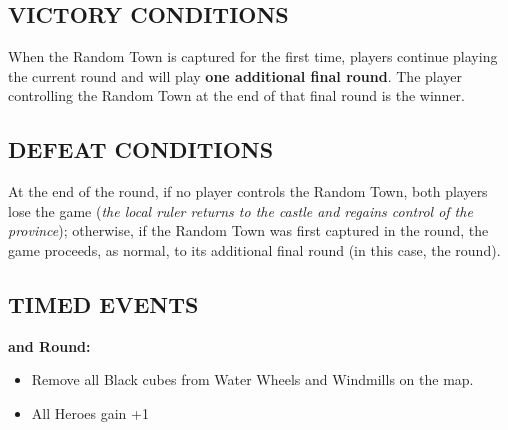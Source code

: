 \begin{multicols*}{2}
\subsection*{\MakeUppercase{Victory Conditions}}
When the Random Town is captured for the first time, players continue playing the current round and will play \textbf{one additional final round}.
The player controlling the Random Town at the end of that final round is the winner.

\subsection*{\MakeUppercase{Defeat Conditions}}
At the end of the  round, if no player controls the Random Town, both players lose the game (\textit{the local ruler returns to the castle and regains control of the province});
otherwise, if the Random Town was first captured in the  round, the game proceeds, as normal, to its additional final round (in this case, the  round).

\subsection*{\MakeUppercase{Timed Events}}

  \textbf{ and  Round:}
\begin{itemize}
  \item Remove all Black cubes from Water Wheels and Windmills on the map.
  \item All Heroes gain +1 
\end{itemize}

\end{multicols*}

